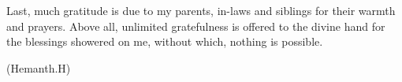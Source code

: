 Last, much gratitude is due to my parents, in-laws and siblings for their warmth and prayers. Above all, unlimited gratefulness is offered to the divine hand for the blessings showered on me, without which, nothing is possible.
\vspace{2em}
\begin{flushright}
    (Hemanth.H)
\end{flushright}